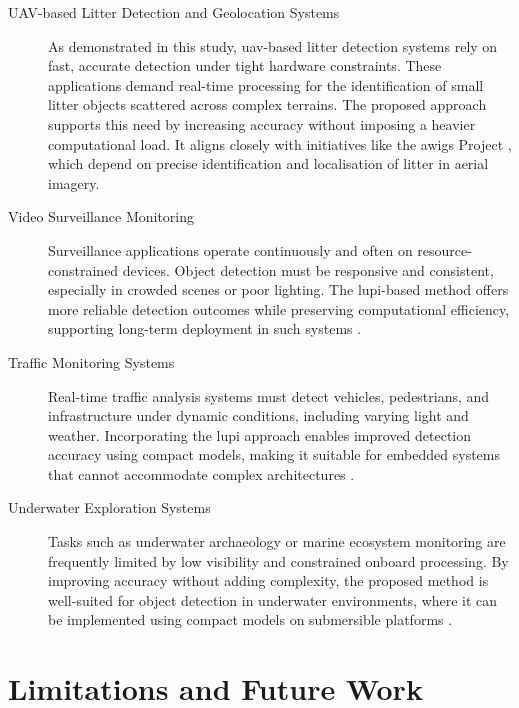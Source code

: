 \begin{description}

\item[UAV-based Litter Detection and Geolocation Systems]
As demonstrated in this study, \gls{uav}-based litter detection systems rely on fast, accurate detection under tight hardware constraints. These applications demand real-time processing for the identification of small litter objects scattered across complex terrains. The proposed approach supports this need by increasing accuracy without imposing a heavier computational load. It aligns closely with initiatives like the \gls{awigs} Project \cite{awigs_project}, which depend on precise identification and localisation of litter in aerial imagery.

\item[Video Surveillance Monitoring]
Surveillance applications operate continuously and often on resource-constrained devices. Object detection must be responsive and consistent, especially in crowded scenes or poor lighting. The \gls{lupi}-based method offers more reliable detection outcomes while preserving computational efficiency, supporting long-term deployment in such systems \cite{surveillance}.

\item[Traffic Monitoring Systems]
Real-time traffic analysis systems must detect vehicles, pedestrians, and infrastructure under dynamic conditions, including varying light and weather. Incorporating the \gls{lupi} approach enables improved detection accuracy using compact models, making it suitable for embedded systems that cannot accommodate complex architectures \cite{traffic_monitoring}.

\item[Underwater Exploration Systems]
Tasks such as underwater archaeology or marine ecosystem monitoring are frequently limited by low visibility and constrained onboard processing. By improving accuracy without adding complexity, the proposed method is well-suited for object detection in underwater environments, where it can be implemented using compact models on submersible platforms \cite{underwater_archeology}.

\end{description}

\section{Limitations and Future Work}
\label{sec:6_future_work}

